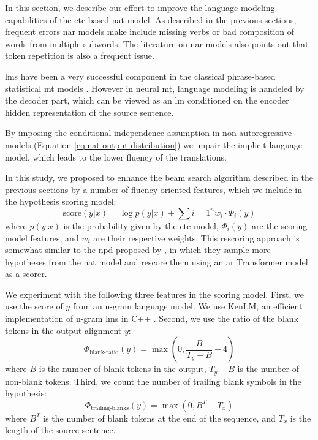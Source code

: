 \noindent
In this section, we describe our effort to improve the language modeling
capabilities of the \acs{ctc}-based \ac{nat} model. As described in the
previous sections, frequent errors \acl{nar} models make include missing verbs
or bad composition of words from multiple subwords. The literature on \ac{nar}
models also points out that token repetition is also a frequent issue. 

\Acp{lm} have been a very successful component in the classical phrase-based
statistical \acs{mt} models \citep{koehn2009statistical}. However in neural
\acs{mt}, language modeling is handeled by the decoder part, which can be
viewed as an \acs{lm} conditioned on the encoder hidden representation of the
source sentence.

By imposing the conditional independence assumption in non-autoregressive
models (Equation \ref{eq:nat-output-distribution}) we impair the implicit
language model, which leads to the lower fluency of the translations.

In this study, we proposed to enhance the beam search algorithm described in
the previous sections  by a number of fluency-oriented
features, which we include in the hypothesis scoring model:
%
\begin{equation}
  \text{score}(y|x) = \log p(y|x) + \sum{i=1}^n w_i \cdot \Phi_i(y)
\end{equation}
%
where $p(y|x)$ is the probability given by the \acs{ctc} model, $\Phi_i(y)$ are
the scoring model features, and $w_i$ are their respective weights. This
rescoring approach is somewhat similar to the \ac{npd} proposed by
\citet{gu2017nonautoregressive}, in which they sample more hypotheses from the
\ac{nat} model and rescore them using an \ac{ar} Transformer model as a scorer.

We experiment with the following three features in the scoring model. First, we
use the score of $y$ from an n-gram language model. We use KenLM, an efficient
implementation of n-gram \acp{lm} in C++
\citep{heafield-2011-kenlm}. Second,
we use the ratio of the blank tokens in the output alignment $y$:
%
\begin{equation}
  \Phi_{\text{blank-ratio}}(y) = \max(0, \frac{B}{T_y - B} - 4 )
\end{equation}
%
where $B$ is the number of blank tokens in the output, $T_y - B$ is the number
of non-blank tokens. Third, we count the number of trailing blank symbols in
the hypothesis:
%
\begin{equation}
  \Phi_{\text{trailing-blanks}}(y) = \max(0, B^T - T_x)
\end{equation}
%
where $B^T$ is the number of blank tokens at the end of the sequence, and $T_x$
is the length of the source sentence.


